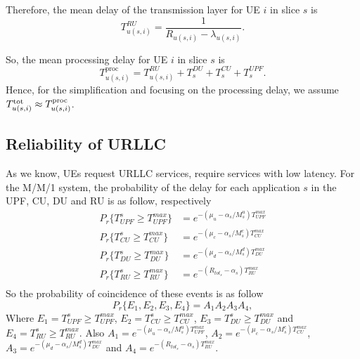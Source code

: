 \documentclass{article}
\begin{document}
Therefore, the mean delay of the transmission layer for UE $i$ in slice $s$ is
\begin{equation}
 T_{u(s,i)}^{RU} = \frac{1}{R_{u(s,i)} - \lambda_{u(s,i)}}.
\end{equation}

So, the mean processing delay for UE $i$ in slice $s$ is 
\begin{equation}
T^{\text{proc}}_{u(s,i)} =  T^{RU}_{u(s,i)} + T^{DU}_{s} + T^{CU}_{s} + T^{UPF}_{s}.
\end{equation}
Hence, for the simplification and focusing on the processing delay, we assume $T^{\text{\text{tot}}}_{u(s,i)} \approx T^{\text{proc}}_{u(s,i)} $.
\subsection{Reliability of URLLC}
As we know, UEs request URLLC services, require services with low latency.
For the M/M/1 system, the probability of the delay for each application $s$ in the UPF, CU, DU and RU is as follow, respectively
\begin{equation}
\begin{split}
P_r\{T_{UPF}^{s} \geq T_{UPF}^{max}\} &= e^{-(\mu_u - \alpha_{s}/{M_s^{u}})T_{UPF}^{max}}\\
P_r\{T_{CU}^{s} \geq T_{CU}^{max}\} &= e^{-(\mu_c - \alpha_{s}/{M_s^{c}})T_{CU}^{max}}\\
P_r\{T_{DU}^{s} \geq T_{DU}^{max}\} &= e^{-(\mu_d - \alpha_{s}/{M_s^{d}})T_{DU}^{max}}\\
P_r\{T_{RU}^{s} \geq T_{RU}^{max}\} &= e^{-(R_{{tot}_s} - \alpha_{s})T_{RU}^{max}}\\
\end{split}
\end{equation} 
So the probability of coincidence of these events is as follow
\begin{equation}
P_r\{E_1, E_2, E_3, E_4\} = A_1 A_2 A_3 A_4,
\end{equation}
Where $E_1 = T_{UPF}^{s} \geq T_{UPF}^{max}$, $E_2 =T_{CU}^{s} \geq T_{CU}^{max} $, $E_3 =T_{DU}^{s} \geq T_{DU}^{max} $ and $E_4 =T_{RU}^{s} \geq T_{RU}^{max} $.
Also $A_1=e^{-(\mu_u - \alpha_{s}/{M_s^{u}})T_{UPF}^{max}}$, $A_2=e^{-(\mu_c - \alpha_{s}/{M_s^{c}})T_{CU}^{max}}$, $A_3= e^{-(\mu_d - \alpha_{s}/{M_s^{d}})T_{DU}^{max}}$ and $A_4 = e^{-(R_{{tot}_s} - \alpha_{s})T_{RU}^{max}}$.
\end{document}
